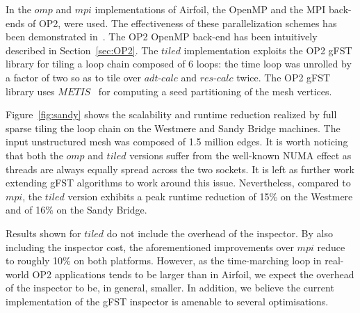 In the $omp$ and $mpi$ implementations of Airfoil, the OpenMP and the MPI back-ends of OP2, were used. The effectiveness of these parallelization schemes has been demonstrated in~\cite{op2-main}. The OP2 OpenMP back-end has been intuitively described in Section~\ref{sec:OP2}. The $tiled$ implementation exploits the OP2 gFST library for tiling a loop chain composed of 6 loops: the time loop was unrolled by a factor of two so as to tile over $adt$-$calc$ and $res$-$calc$ twice. The OP2 gFST library uses $METIS$~\cite{METIS} for computing a seed partitioning
of the mesh vertices.

Figure~\ref{fig:sandy} shows the scalability and runtime reduction realized by full sparse tiling the loop chain on the Westmere and Sandy Bridge machines. The input unstructured mesh was composed of 1.5 million edges. It is worth noticing that both the $omp$ and $tiled$ versions suffer from the well-known NUMA effect as threads are always equally spread across the two sockets. It is left as further work extending gFST algorithms to work around this issue. Nevertheless, compared to $mpi$, the $tiled$ version exhibits a peak runtime reduction of 15\% on the Westmere and of 16\% on the Sandy Bridge.  %


Results shown for $tiled$ do not include the overhead of the inspector. By also including the inspector cost, the aforementioned improvements over $mpi$ reduce to roughly 10\% on both platforms. However, as the time-marching loop in real-world OP2 applications tends to be larger than in Airfoil, we expect the overhead of the inspector to be, in general, smaller. In addition, we believe the current implementation of the gFST inspector is amenable to several optimisations. 


